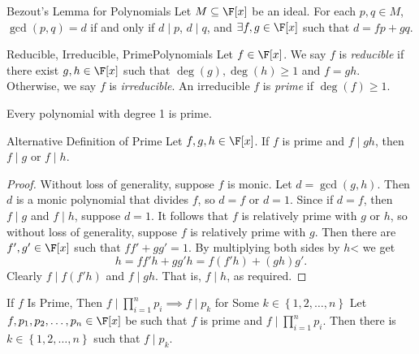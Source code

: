 \documentclass[linearalgebra]{subfiles}
\begin{document}
    \begin{theorem}{Bezout's Lemma for Polynomials}
        Let $M\subseteq \F[x]$ be an ideal. For each $p,q\in M$, $\gcd(p,q) = d$ if and only if $d\mid p$, $d\mid q$, and $\exists f,g\in \F[x]$ such that $d = fp+gq$.
    \end{theorem}

    \begin{definition}{Reducible, Irreducible, Prime}{Polynomials}
        Let $f\in \F[x]$. We say $f$ is \emph{reducible} if there exist $g,h\in \F[x]$ such that $\deg(g), \deg(h)\geq 1$ and $f=gh$. Otherwise, we say $f$ is \emph{irreducible}. An irreducible $f$ is \emph{prime} if $\deg(f)\geq 1$.
    \end{definition}

    \begin{remark}
        Every polynomial with degree 1 is prime.
    \end{remark}

    \begin{prop}{Alternative Definition of Prime}
        Let $f,g,h\in \F[x]$. If $f$ is prime and $f\mid gh$, then $f\mid g$ or $f\mid h$.
    \end{prop}

    \begin{proof}
        Without loss of generality, suppose $f$ is monic. Let $d=\gcd(g,h)$. Then $d$ is a monic polynomial that divides $f$, so $d=f$ or $d=1$. Since if $d=f$, then $f\mid g$ and $f\mid h$, suppose $d=1$. It follows that $f$ is relatively prime with $g$ or $h$, so without loss of generality, suppose $f$ is relatively prime with $g$. Then there are $f', g'\in \F[x]$ such that $ff'+gg'=1$. By multiplying both sides by $h$< we get
        \begin{equation*}
            h = ff'h + gg'h = f(f'h) + (gh)g'.
        \end{equation*}
        Clearly $f\mid f(f'h)$ and $f\mid gh$. That is, $f\mid h$, as required.
    \end{proof}

    \begin{cor}{If $f$ Is Prime, Then $f\mid \prod^n_{i=1} p_i \implies f\mid p_k$ for Some $k\in \left\lbrace 1, 2, \ldots, n \right\rbrace $}
        Let $f, p_1, p_2, \ldots, p_n\in \F[x]$ be such that $f$ is prime and $f\mid \prod^n_{i=1} p_i$. Then there is $k\in \left\lbrace 1, 2, \ldots, n \right\rbrace$ such that $f\mid p_k$.
    \end{cor}	
\end{document}
